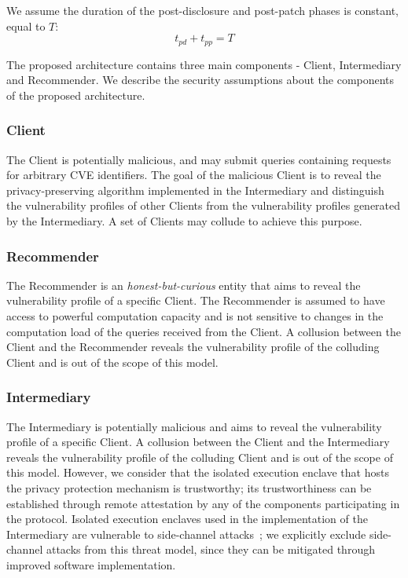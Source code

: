 {We assume the duration of the post-disclosure and post-patch phases is constant, equal to $T$:
\begin{equation}
    t_{pd} + t_{pp} = T
\end{equation}

The proposed architecture contains three main components - Client, Intermediary and Recommender.
We describe the security assumptions about the components of the proposed architecture.
\subsubsection*{Client}
The Client is potentially malicious, and may submit queries containing requests for arbitrary CVE identifiers.
The goal of the malicious Client is to reveal the privacy-preserving algorithm implemented in the Intermediary and distinguish the vulnerability profiles of other Clients from the vulnerability profiles generated by the Intermediary.
A set of Clients may collude to achieve this purpose.

\subsubsection*{Recommender}
The Recommender is an \textit{honest-but-curious} entity that aims to reveal the vulnerability profile of a specific Client.
The Recommender is assumed to have access to powerful computation capacity and is not sensitive to changes in the computation load of the queries received from the Client.
A collusion between the Client and the Recommender reveals the vulnerability profile of the colluding Client and is out of the scope of this model.

\subsubsection*{Intermediary}
The Intermediary is potentially malicious and aims to reveal the vulnerability profile of a specific Client.
A collusion between the Client and the Intermediary reveals the vulnerability profile of the colluding Client and is out of the scope of this model.
However, we consider that the isolated execution enclave that hosts the privacy protection mechanism is trustworthy;
its trustworthiness can be established through remote attestation by any of the components participating in the protocol.
Isolated execution enclaves used in the implementation of the Intermediary are vulnerable to side-channel attacks~\cite{wang:2017};
we explicitly exclude side-channel attacks from this threat model, since they can be mitigated through improved software implementation.

}
